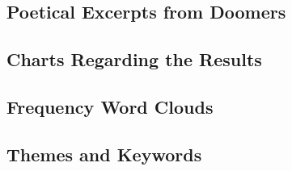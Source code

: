 \documentclass[../report.tex]{subfiles}
\begin{document}
\subsection{Poetical Excerpts from Doomers}


\subsection{Charts Regarding the Results}


\subsection{Frequency Word Clouds}


\subsection{Themes and Keywords}

\end{document}
